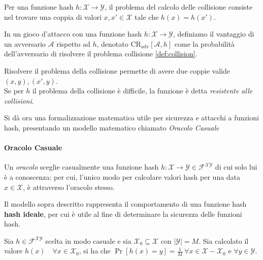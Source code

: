 \vspace{1em}
\begin{definition}
    \label{def:collision}
    Per una funzione hash $h: \mathcal{X} \to \mathcal{Y}$, il problema del calcolo delle collisione consiste nel trovare una coppia di valori $x,x' \in \mathcal{X}$ tale che $h(x) = h(x')$.
\end{definition}

\begin{definition}
    In un gioco d'attacco con una funzione hash $h: \mathcal{X} \to \mathcal{Y}$, definiamo il vantaggio di un avversario $\mathcal{A}$ rispetto ad $h$, denotato $\text{CR}_{\text{adv}}[\mathcal{A},h]$ come la probabilità dell'avversario di risolvere il problema collisione \ref{def:collision}.
\end{definition}

\noindent
Risolvere il problema della collisione permette di avere due coppie valide $(x,y), (x',y)$. \\ Se per $h$ il problema della collisione è difficile, la funzione è detta \emph{resistente alle collisioni}.

\vspace{1em}
Si dà ora una formalizzazione matematica utile per sicurezza e attacchi a funzioni hash, presentando un modello matematico chiamato \emph{Oracolo Casuale}

\paragraph{Oracolo Casuale}
    Un \emph{oracolo} sceglie casualmente una funzione hash $h: \mathcal{X} \to \mathcal{Y} \in \mathcal{F}^{\mathcal{X}\mathcal{Y}}$ di cui solo lui è a conoscenza: per cui, l'unico modo per calcolare valori hash per una data $x \in \mathcal{X}$, è attraverso l'oracolo stesso.

\vspace{0.2cm} \noindent Il modello sopra descritto rappresenta il comportamento di una funzione hash \textbf{hash ideale}, per cui è utile al fine di determinare la sicurezza delle funzioni hash.

\begin{theorem}
    \label{thm:1}
    Sia $h \in \mathcal{F}^{\mathcal{X}\mathcal{Y}}$ scelta in modo casuale e sia $\mathcal{X}_0 \subseteq \mathcal{X}$ con $|\mathcal{Y}| = M$. Sia calcolato il valore $h(x) \quad \forall x \in \mathcal{X}_0$, si ha che $\Pr[h(x) = y] = \frac{1}{M} \ \forall x \in \mathcal{X} - \mathcal{X}_0$ e $ \forall y \in \mathcal{Y}$.   
\end{theorem}

